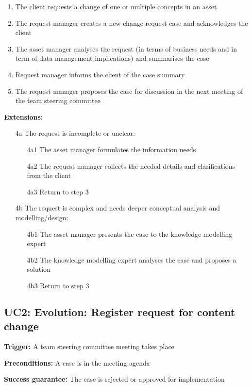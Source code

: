 	\begin{enumerate}
		\item The client requests a change of one or multiple concepts in an asset
		\item The request manager creates a new change request case and acknowledges the client
		\item The asset manager analyses the request (in terms of business needs and in term of data management implications) and summarises the case
		\item Request manager informs the client of the case summary
		\item The request manager proposes the case for discussion in the next meeting of the team steering committee		
	\end{enumerate}
	\textbf{Extensions:}
	\begin{enumerate}
		\item [4a] The request is incomplete or unclear:
		\begin{enumerate}
			\item [4a1] The asset manager formulates the information needs			
			\item [4a2] The request manager collects the needed details and clarifications from the client
			\item [4a3] Return to step 3 
		\end{enumerate}
		\item [4b] The request is complex and needs deeper conceptual analysis and modelling/design:
		\begin{enumerate}
			\item [4b1] The asset manager presents the case to the knowledge modelling expert 
			\item [4b2] The knowledge modelling expert analyses the case and proposes a solution
			\item [4b3] Return to step 3			
		\end{enumerate}
	\end{enumerate}
	
	
	\subsection{UC2: Evolution: Register request for content change}
	\label{sec:uc2}
	
	\textbf{Trigger:} A team steering committee meeting takes place 
	
	\textbf{Preconditions:} A case is in the meeting agenda 
	
	\textbf{Success guarantee:} The case is rejected or approved for implementation
	
